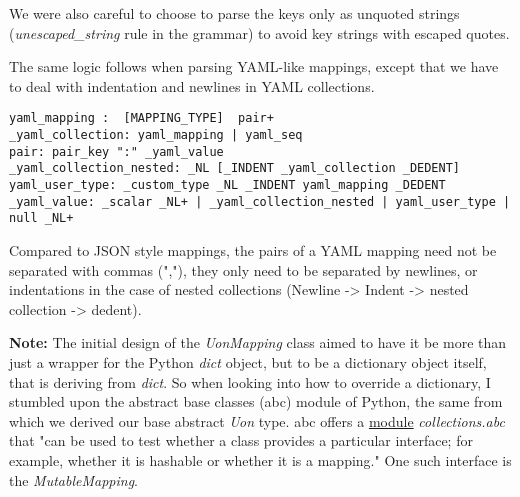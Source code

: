 \documentclass[12pt]{article}
\begin{document}
We were also careful to choose to parse the keys only as unquoted strings (\emph{unescaped\_string} rule in the grammar) to avoid key strings with escaped quotes.

The same logic follows when parsing YAML-like mappings, except that we have to deal with indentation and newlines in YAML collections.
\begin{lstlisting}[label=grammar:uon_yaml]
yaml_mapping :  [MAPPING_TYPE]  pair+
_yaml_collection: yaml_mapping | yaml_seq
pair: pair_key ":" _yaml_value
_yaml_collection_nested: _NL [_INDENT _yaml_collection _DEDENT]
yaml_user_type: _custom_type _NL _INDENT yaml_mapping _DEDENT
_yaml_value: _scalar _NL+ | _yaml_collection_nested | yaml_user_type | null _NL+
\end{lstlisting}

Compared to JSON style mappings, the pairs of a YAML mapping need not be separated with commas (","), they only need to be separated by newlines, or indentations in the case of nested collections (Newline -> Indent -> nested collection -> dedent).

\textbf{Note:} The initial design of the \emph{UonMapping} class aimed to have it be more than just a wrapper for the Python \emph{dict} object, but to be a dictionary object itself, that is deriving from \emph{dict}. So when looking into how to override a dictionary, I stumbled upon the abstract base classes (abc) module of Python, the same from which we derived our base abstract \emph{Uon} type. abc offers a \href{https://docs.python.org/3/library/collections.abc.html}{module} \emph{collections.abc} that "can be used to test whether a class provides a particular interface; for example, whether it is hashable or whether it is a mapping." One such interface is the \emph{MutableMapping}.
\end{document}
